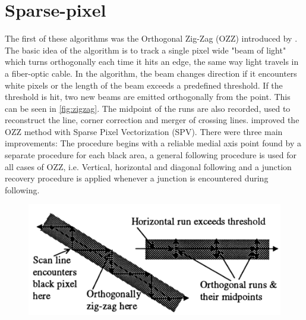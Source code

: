 \section{Sparse-pixel}
The first of these algorithms was the Orthogonal Zig-Zag (OZZ) introduced by \citet{Dori1997}. The basic idea of the algorithm is to track a single pixel wide "beam of light" which turns orthogonally each time it hits an edge, the same way light travels in a fiber-optic cable. In the algorithm, the beam changes direction if it encounters white pixels or the length of the beam exceeds a predefined threshold. If the threshold is hit, two new beams are emitted orthogonally from the point. This can be seen in \autoref{fig:zigzag}. The midpoint of the runs are also recorded, used to reconstruct the line, corner correction and merger of crossing lines. \citet{Wenyin1996} improved the OZZ method with Sparse Pixel Vectorization (SPV). There were three main improvements: The procedure begins with a reliable medial axis point found by a separate procedure for each black area, a general following procedure is used for all cases of OZZ, i.e. Vertical, horizontal and diagonal following and a junction recovery procedure is applied whenever a junction is encountered during following.

\begin{figure}[H]
	\centering
	\includegraphics[width=0.8\linewidth]{fig/zigzag.png}
	\label{fig:zigzag}
\end{figure}